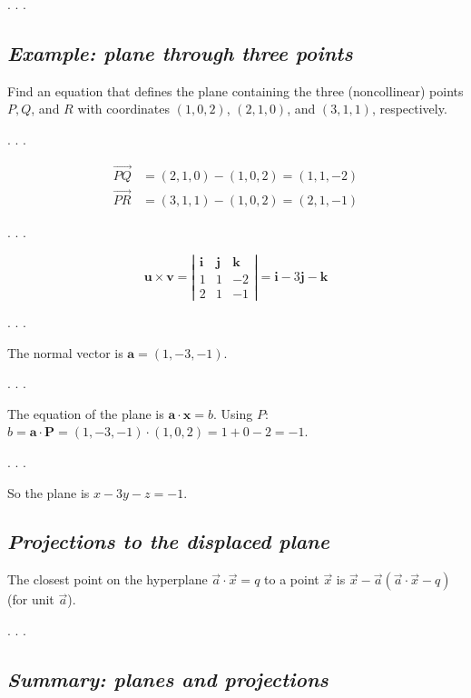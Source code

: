 \documentclass[
  letterpaper,
  DIV=11,
  numbers=noendperiod]{scrartcl}
\begin{document}
. . .

\subsection{\texorpdfstring{\emph{Example: plane through three
points}}{Example: plane through three points}}\label{example-plane-through-three-points}

Find an equation that defines the plane containing the three
(noncollinear) points \(P, Q\), and \(R\) with coordinates \((1,0,2)\),
\((2,1,0)\), and \((3,1,1)\), respectively.

. . .

\[
\begin{aligned}
\overrightarrow{P Q}&=(2,1,0)-(1,0,2)=(1,1,-2) \\
\overrightarrow{P R}&=(3,1,1)-(1,0,2)=(2,1,-1)
\end{aligned}
\]

. . .

\[
\mathbf{u} \times \mathbf{v}=\left|\begin{array}{ccc}
\mathbf{i} & \mathbf{j} & \mathbf{k} \\
1 & 1 & -2 \\
2 & 1 & -1
\end{array}\right|=\mathbf{i}-3 \mathbf{j}-\mathbf{k}
\]

. . .

The normal vector is \(\mathbf{a}=(1,-3,-1)\).

. . .

The equation of the plane is \(\mathbf{a} \cdot \mathbf{x}=b\). Using
\(P\):
\(b=\mathbf{a} \cdot \mathbf{P}=(1,-3,-1) \cdot (1,0,2)=1+0-2=-1\).

. . .

So the plane is \(x - 3y - z = -1\).

\subsection{\texorpdfstring{\emph{Projections to the displaced
plane}}{Projections to the displaced plane}}\label{projections-to-the-displaced-plane}

The closest point on the hyperplane \(\vec a \cdot \vec x = q\) to a
point \(\vec x\) is \(\vec x - \vec a (\vec a \cdot \vec x - q)\) (for
unit \(\vec a\)).

. . .

\subsection{\texorpdfstring{\emph{Summary: planes and
projections}}{Summary: planes and projections}}\label{summary-planes-and-projections}
\end{document}
